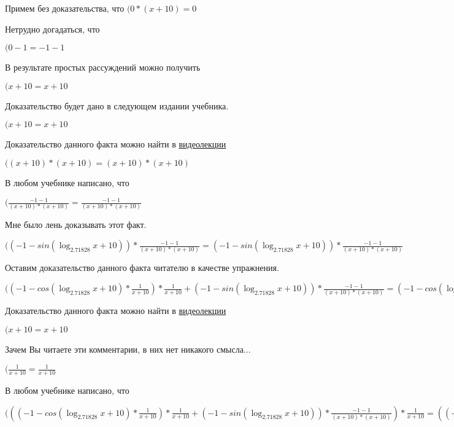 \documentclass[12pt,a4paper,fleqn]{article}
\theoremstyle{definition}
\begin{document}
Примем без доказательства, что
$( 0  * ( x  +  10 ) =  0 $

Нетрудно догадаться, что

$( 0  -  1  =  -1  -  1 $

В результате простых рассуждений можно получить

$( x  +  10  =  x  +  10 $

Доказательство будет дано в следующем издании учебника.

$( x  +  10  =  x  +  10 $

Доказательство данного факта можно найти в \href{https://www.youtube.com/watch?v=dQw4w9WgXcQ}{видеолекции}

$(( x  +  10 ) * ( x  +  10 ) = ( x  +  10 ) * ( x  +  10 )$

В любом учебнике написано, что

$(\frac{ -1  -  1 }{( x  +  10 ) * ( x  +  10 )}
 = \frac{ -1  -  1 }{( x  +  10 ) * ( x  +  10 )}
$

Мне было лень доказывать этот факт.

$(( -1  - sin(\log_{ 2.71828 }{ x  +  10 })) * \frac{ -1  -  1 }{( x  +  10 ) * ( x  +  10 )}
 = ( -1  - sin(\log_{ 2.71828 }{ x  +  10 })) * \frac{ -1  -  1 }{( x  +  10 ) * ( x  +  10 )}
$

Оставим доказательство данного факта читателю в качестве упражнения.

$(( -1  - cos(\log_{ 2.71828 }{ x  +  10 }) * \frac{ 1 }{ x  +  10 }
) * \frac{ 1 }{ x  +  10 }
 + ( -1  - sin(\log_{ 2.71828 }{ x  +  10 })) * \frac{ -1  -  1 }{( x  +  10 ) * ( x  +  10 )}
 = ( -1  - cos(\log_{ 2.71828 }{ x  +  10 }) * \frac{ 1 }{ x  +  10 }
) * \frac{ 1 }{ x  +  10 }
 + ( -1  - sin(\log_{ 2.71828 }{ x  +  10 })) * \frac{ -1  -  1 }{( x  +  10 ) * ( x  +  10 )}
$

Доказательство данного факта можно найти в \href{https://www.youtube.com/watch?v=dQw4w9WgXcQ}{видеолекции}

$( x  +  10  =  x  +  10 $

Зачем Вы читаете эти комментарии, в них нет никакого смысла...

$(\frac{ 1 }{ x  +  10 }
 = \frac{ 1 }{ x  +  10 }
$

В любом учебнике написано, что

$((( -1  - cos(\log_{ 2.71828 }{ x  +  10 }) * \frac{ 1 }{ x  +  10 }
) * \frac{ 1 }{ x  +  10 }
 + ( -1  - sin(\log_{ 2.71828 }{ x  +  10 })) * \frac{ -1  -  1 }{( x  +  10 ) * ( x  +  10 )}
) * \frac{ 1 }{ x  +  10 }
 = (( -1  - cos(\log_{ 2.71828 }{ x  +  10 }) * \frac{ 1 }{ x  +  10 }
) * \frac{ 1 }{ x  +  10 }
 + ( -1  - sin(\log_{ 2.71828 }{ x  +  10 })) * \frac{ -1  -  1 }{( x  +  10 ) * ( x  +  10 )}
) * \frac{ 1 }{ x  +  10 }
$
\end{document}
